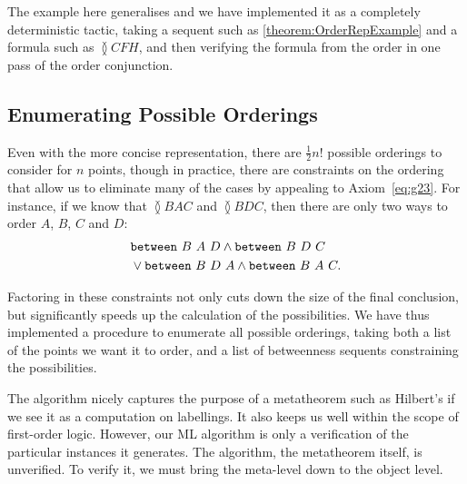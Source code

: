 The example here generalises and we have implemented it as a completely deterministic tactic, taking a sequent such as \eqref{theorem:OrderRepExample} and a formula such as $\between{C}{F}{H}$, and then verifying the formula from the order in one pass of the order conjunction.

\subsection{Enumerating Possible Orderings}
Even with the more concise representation, there are $\frac{1}{2}n!$ possible orderings to consider for $n$ points, though in practice, there are constraints on the ordering that allow us to eliminate many of the cases by appealing to Axiom~\ref{eq:g23}. For instance, if we know that $\between{B}{A}{C}$ and $\between{B}{D}{C}$, then there are only two ways to order $A$, $B$, $C$ and $D$:
\begin{align*}
&\texttt{between}\ B\ A\ D\wedge\texttt{between}\ B\ D\ C\\
&\vee\texttt{between}\ B\ D\ A\wedge\texttt{between}\ B\ A\ C.
\end{align*}

Factoring in these constraints not only cuts down the size of the final conclusion, but significantly speeds up the calculation of the possibilities. We have thus implemented a procedure to enumerate all possible orderings, taking both a list of the points we want it to order, and a list of betweenness sequents constraining the possibilities.

The algorithm nicely captures the purpose of a metatheorem such as Hilbert's if we see it as a computation on labellings. It also keeps us well within the scope of first-order logic. However, our ML algorithm is only a verification of the particular instances it generates. The algorithm, the metatheorem itself, is unverified. To verify it, we must bring the meta-level down to the object level.

